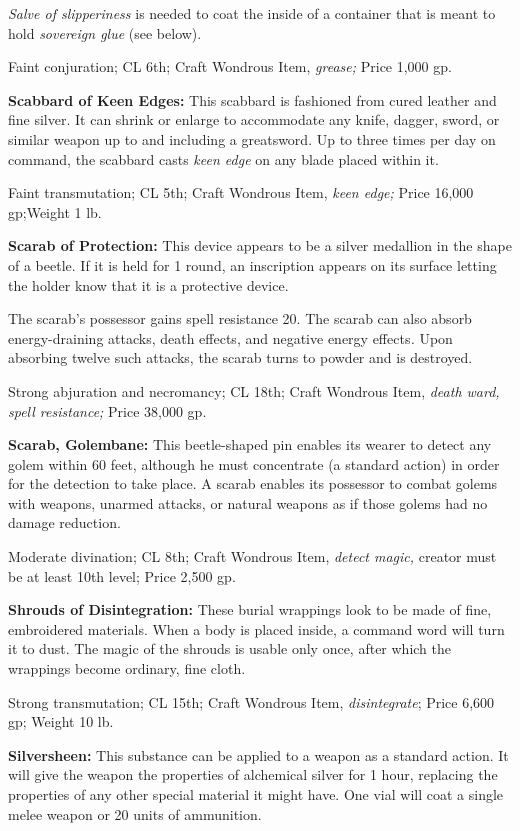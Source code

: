 \documentclass{article}
\begin{document}
\textit{Salve of slipperiness }is needed to coat the inside of a container that 
is meant to hold \textit{sovereign glue }(see below).

Faint conjuration; CL 6th; Craft Wondrous Item, \textit{grease; }Price 1,000 gp.

\textbf{Scabbard of Keen Edges:} This scabbard is fashioned from cured leather 
and fine silver. It can shrink or enlarge to accommodate any knife, dagger, sword, 
or similar weapon up to and including a greatsword. Up to three times per day on 
command, the scabbard casts \textit{keen edge }on any blade placed within it.

Faint transmutation; CL 5th; Craft Wondrous Item, \textit{keen edge; }Price 16,000 
gp;Weight 1 lb.

\textbf{Scarab of Protection:} This device appears to be a silver medallion in 
the shape of a beetle. If it is held for 1 round, an inscription appears on its 
surface letting the holder know that it is a protective device.

The scarab's possessor gains spell resistance 20. The scarab can also absorb energy-draining 
attacks, death effects, and negative energy effects\textit{. }Upon absorbing twelve 
such attacks, the scarab turns to powder and is destroyed.

Strong abjuration and necromancy; CL 18th; Craft Wondrous Item, \textit{death ward, 
spell resistance; }Price 38,000 gp.

\textbf{Scarab, Golembane:} This beetle-shaped pin enables its wearer to detect 
any golem within 60 feet, although he must concentrate (a standard action) in order 
for the detection to take place. A scarab enables its possessor to combat golems 
with weapons, unarmed attacks, or natural weapons as if those golems had no damage 
reduction.

Moderate divination; CL 8th; Craft Wondrous Item, \textit{detect magic, }creator 
must be at least 10th level; Price 2,500 gp.

\textbf{Shrouds of Disintegration:} These burial wrappings look to be made of fine, 
embroidered materials. When a body is placed inside, a command word will turn it 
to dust. The magic of the shrouds is usable only once, after which the wrappings 
become ordinary, fine cloth.

Strong transmutation; CL 15th; Craft Wondrous Item, \textit{disintegrate}; Price 
6,600 gp; Weight 10 lb.

\textbf{Silversheen:} This substance can be applied to a weapon as a standard action. 
It will give the weapon the properties of alchemical silver for 1 hour, replacing 
the properties of any other special material it might have. One vial will coat 
a single melee weapon or 20 units of ammunition.
\end{document}
